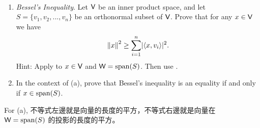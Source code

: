 \begin{exercise} \label{exercise 6.2.16} \ 

\begin{enumerate}
\item \emph{Bessel's Inequality}.
Let \(\textsf{V}\) be an inner product space, and let \(S = \{ v_1, v_2, ..., v_n \}\) be an orthonormal subset of \(\textsf{V}\).
Prove that for any \(x \in \textsf{V}\) we have
\[
    \left\lVert x\right\rVert^2 \ge \sum_{i = 1}^n \lvert\left< x, v_i \right>\rvert^2.
\]
Hint: Apply  to \(x \in \textsf{V}\) and \(\textsf{W} = \operatorname{span}(S)\).
Then use .
\item In the context of (a), prove that Bessel's inequality is an equality if and only if \(x \in \operatorname{span}(S)\).
\end{enumerate}
\end{exercise}

\begin{note}
For (a), 不等式左邊就是向量的長度的平方，不等式右邊就是向量在\ \(\textsf{W} = \operatorname{span}(S)\) 的投影的長度的平方。
\end{note}

